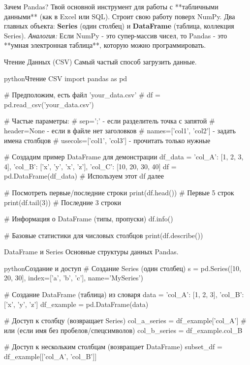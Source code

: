 \begin{textbox}{Зачем Pandas?}
    Твой основной инструмент для работы с **табличными данными** (как в Excel или SQL). Строит свою работу поверх NumPy. Два главных объекта: \textbf{Series} (один столбец) и \textbf{DataFrame} (таблица, коллекция Series).
    \textit{Аналогия:} Если NumPy - это супер-массив чисел, то Pandas - это **умная электронная таблица**, которую можно программировать.
\end{textbox}

\begin{myblock}{{Чтение Данных (CSV)}}
    Самый частый способ загрузить данные.
    \begin{codebox}{python}{Чтение CSV}
    import pandas as pd

    # Предположим, есть файл 'your_data.csv'
    # df = pd.read_csv('your_data.csv')

    # Частые параметры:
    # sep=';' - если разделитель точка с запятой
    # header=None - если в файле нет заголовков
    # names=['col1', 'col2'] - задать имена столбцов
    # usecols=['col1', 'col3'] - прочитать только нужные

    # Создадим пример DataFrame для демонстрации
    df_data = {'col_A': [1, 2, 3, 4], 'col_B': ['x', 'y', 'x', 'z'], 'col_C': [10, 20, 30, 40]}
    df = pd.DataFrame(df_data) # Используем этот df далее

    # Посмотреть первые/последние строки
    print(df.head())    # Первые 5 строк
    print(df.tail(3))   # Последние 3 строки

    # Информация о DataFrame (типы, пропуски)
    df.info()

    # Базовые статистики для числовых столбцов
    print(df.describe())
    \end{codebox}
\end{myblock}

\begin{myblock}{{DataFrame и Series}}
    Основные структуры данных Pandas.
    \begin{codebox}{python}{Создание и доступ}
    # Создание Series (один столбец)
    s = pd.Series([10, 20, 30], index=['a', 'b', 'c'], name='MySeries')

    # Создание DataFrame (таблица) из словаря
    data = {'col_A': [1, 2, 3], 'col_B': ['x', 'y', 'z']}
    df_example = pd.DataFrame(data)

    # Доступ к столбцу (возвращает Series)
    col_a_series = df_example['col_A']
    # или (если имя без пробелов/спецсимволов)
    col_b_series = df_example.col_B

    # Доступ к нескольким столбцам (возвращает DataFrame)
    subset_df = df_example[['col_A', 'col_B']]
    \end{codebox}
\end{myblock}

